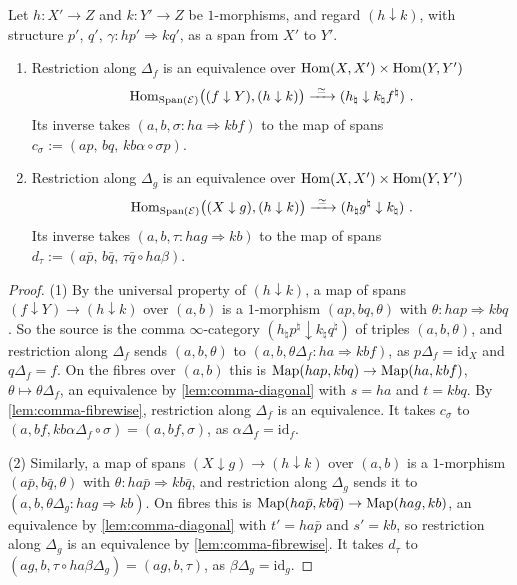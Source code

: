 \begin{lem}
\label{lem:comma-maps}
%
Let
$h\colon X' \to Z$
and
$k\colon Y' \to Z$
be $1$-morphisms, and regard $(h \downarrow k)$, with structure $p'$, $q'$,
$\gamma\colon hp' \Rightarrow kq'$,
as a span from $X'$ to $Y'$.
\begin{enumerate}
\item Restriction along $\Delta_{f}$ is an equivalence over
$\operatorname{Hom}(X,X') \times \operatorname{Hom}(Y,Y')$
\begin{equation*}
\operatorname{Hom}_{\mathrm{Span}(\mathcal{E})}\bigl((f \downarrow Y),(h \downarrow k)\bigr)
\xrightarrow{\ \simeq\ } (h_{\natural} \downarrow k_{\natural}f^{\natural}) \
.
\end{equation*}
Its inverse takes
$(a,b,\sigma\colon ha \Rightarrow kbf)$
to the map of spans
$c_{\sigma} := (ap,\,bq,\,kb\alpha \circ \sigma p)$.
\item Restriction along $\Delta_{g}$ is an equivalence over
$\operatorname{Hom}(X,X') \times \operatorname{Hom}(Y,Y')$
\begin{equation*}
\operatorname{Hom}_{\mathrm{Span}(\mathcal{E})}\bigl((X \downarrow g),(h \downarrow k)\bigr)
\xrightarrow{\ \simeq\ } (h_{\natural}g^{\natural} \downarrow k_{\natural}) \
.
\end{equation*}
Its inverse takes
$(a,b,\tau\colon hag \Rightarrow kb)$
to the map of spans
$d_{\tau} := (a\bar p,\,b\bar q,\,\tau\bar q \circ ha\beta)$.
\end{enumerate}
\end{lem}

\begin{proof}
%
(1) By the universal property of $(h \downarrow k)$, a map of spans
$(f \downarrow Y) \to (h \downarrow k)$
over $(a,b)$ is a $1$-morphism
$(ap,bq,\theta)$
with
$\theta\colon hap \Rightarrow kbq$.
So the source is the comma $\infty$-category
$(h_{\natural}p^{\natural} \downarrow k_{\natural}q^{\natural})$
of triples $(a,b,\theta)$, and restriction along $\Delta_{f}$ sends
$(a,b,\theta)$
to
$(a,b,\theta\Delta_{f}\colon ha \Rightarrow kbf)$,
as
$p\Delta_{f} = \mathrm{id}_{X}$
and
$q\Delta_{f} = f$.
On the fibres over $(a,b)$ this is
$\operatorname{Map}(hap,kbq) \to \operatorname{Map}(ha,kbf)$,
$\theta \mapsto \theta\Delta_{f}$,
an equivalence by \cref{lem:comma-diagonal} with $s = ha$ and $t = kbq$. By
\cref{lem:comma-fibrewise}, restriction along $\Delta_{f}$ is an equivalence.
It takes $c_{\sigma}$ to
$(a,bf,kb\alpha\Delta_{f} \circ \sigma) = (a,bf,\sigma)$,
as
$\alpha\Delta_{f} = \mathrm{id}_{f}$.

(2) Similarly, a map of spans
$(X \downarrow g) \to (h \downarrow k)$
over $(a,b)$ is a $1$-morphism
$(a\bar p,b\bar q,\theta)$
with
$\theta\colon ha\bar p \Rightarrow kb\bar q$,
and restriction along $\Delta_{g}$ sends it to
$(a,b,\theta\Delta_{g}\colon hag \Rightarrow kb)$.
On fibres this is
$\operatorname{Map}(ha\bar p,kb\bar q) \to \operatorname{Map}(hag,kb)$,
an equivalence by \cref{lem:comma-diagonal} with $t' = ha\bar p$ and
$s' = kb$, so restriction along $\Delta_{g}$ is an equivalence by
\cref{lem:comma-fibrewise}. It takes $d_{\tau}$ to
$(ag,b,\tau \circ ha\beta\Delta_{g}) = (ag,b,\tau)$,
as
$\beta\Delta_{g} = \mathrm{id}_{g}$.
\end{proof}

